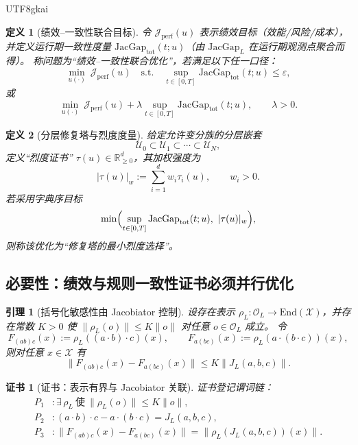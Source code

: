 \documentclass[12pt]{article}
\newtheorem{definition}{定义}[section]
\newtheorem{lemma}{引理}[section]
\newtheorem{Certificate}{证书}[section]
\newcommand{\RR}{\mathbb{R}}
\newcommand{\JacGap}{\ensuremath{\mathrm{JacGap}}} %
\begin{document}
\begin{CJK*}{UTF8}{gkai}
\begin{definition}[绩效--一致性联合目标]
令 $\mathcal{J}_{\mathrm{perf}}(u)$ 表示绩效目标（效能/风险/成本），
并定义运行期一致性度量 $\JacGap_{\mathrm{tot}}(t;u)$（由 $\JacGap_L$ 在运行期观测点聚合而得）。
称问题为“绩效--一致性联合优化”，若满足以下任一口径：
\[
  \min_{u(\cdot)}\ \mathcal{J}_{\mathrm{perf}}(u)
  \quad\text{s.t.}\quad
  \sup_{t\in[0,T]}\JacGap_{\mathrm{tot}}(t;u)\le \varepsilon,
\]
或
\[
  \min_{u(\cdot)}\ \mathcal{J}_{\mathrm{perf}}(u)
  +\lambda\sup_{t\in[0,T]}\JacGap_{\mathrm{tot}}(t;u),
  \qquad \lambda>0.
\]
\end{definition}

\begin{definition}[分层修复塔与烈度度量]
给定允许变分族的分层嵌套
\[
  \mathcal{U}_0\subset \mathcal{U}_1\subset\cdots\subset\mathcal{U}_N,
\]
定义“烈度证书” $\tau(u)\in\RR_{\ge 0}^d$，其加权强度为
\[
  |\tau(u)|_w:=\sum_{i=1}^d w_i\tau_i(u),\qquad w_i>0.
\]
若采用字典序目标
\[
  \min\Bigl(\sup_{t\in[0,T]}\JacGap_{\mathrm{tot}}(t;u),\ |\tau(u)|_w\Bigr),
\]
则称该优化为“修复塔的最小烈度选择”。
\end{definition}

\subsection{必要性：绩效与规则一致性证书必须并行优化}
\label{sec:open-system-necessity}

\begin{lemma}[括号化敏感性由 Jacobiator 控制]
\label{lem:jacobiator-bracketing-sensitivity}
设存在表示 $\rho_L:\mathcal{O}_L\to \mathrm{End}(\mathcal{X})$，并存在常数 $K>0$ 使
$\|\rho_L(o)\|\le K\|o\|$ 对任意 $o\in\mathcal{O}_L$ 成立。
令
\[
  F_{(ab)c}(x):=\rho_L((a\cdot b)\cdot c)(x),
  \qquad
  F_{a(bc)}(x):=\rho_L(a\cdot(b\cdot c))(x),
\]
则对任意 $x\in\mathcal{X}$ 有
\[
  \|F_{(ab)c}(x)-F_{a(bc)}(x)\|
  \le K\|J_L(a,b,c)\|.
\]
\end{lemma}

\begin{Certificate}[证书：表示有界与 Jacobiator 关联]
\label{cert:jacobiator-bracketing-sensitivity}
证书登记谓词链：
\[
\begin{aligned}
  P_1 &: \exists\,\rho_L\ \text{使}\ \|\rho_L(o)\|\le K\|o\|,\\
  P_2 &: (a\cdot b)\cdot c-a\cdot(b\cdot c)=J_L(a,b,c),\\
  P_3 &: \|F_{(ab)c}(x)-F_{a(bc)}(x)\|=\|\rho_L(J_L(a,b,c))(x)\|.
\end{aligned}
\]
\end{Certificate}


\end{CJK*}
\end{document}
